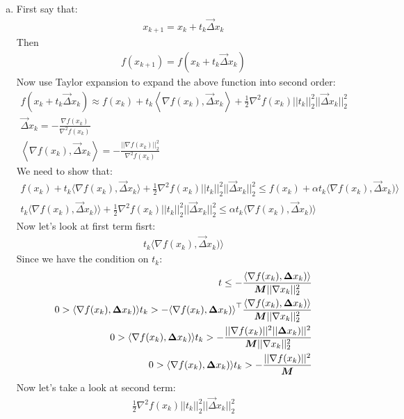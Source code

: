 \documentclass[12pt,twoside]{article}
\begin{document}
\begin{enumerate}[a)]
\item 
First say that:
\begin{align}
x_{k+1} = x_k + t_k \vec{\Delta}x_k
\end{align}
Then 
\begin{align}
f(x_{k+1}) = f(x_k + t_k \vec{\Delta}x_k)
\end{align}
Now use Taylor expansion to expand the above function into second order:
\begin{align}
f(x_k + t_k \vec{\Delta}x_k) \approx f(x_k) + t_k\left\langle\nabla f(x_k), \vec{\Delta}x_k\right\rangle + \frac{1}{2}\nabla^2 f(x_k)||t_k||_2^2||\vec{\Delta}x_k||_2^2\\
\vec{\Delta}x_k = - \frac{\nabla f(x_k)}{\nabla^2 f(x_k)}\\
\left\langle\nabla f(x_k), \vec{\Delta}x_k\right\rangle = - \frac{||\nabla f(x_k)||_2^2}{\nabla^2 f(x_k)}
\end{align}
We need to show that:
\begin{align}
f(x_k) + t_k\langle \nabla f(x_k), \vec{\Delta}x_k\rangle + \frac{1}{2}\nabla^2 f(x_k)||t_k||_2^2||\vec{\Delta}x_k||_2^2 \leq f(x_k) + \alpha t_k \langle\nabla f(x_k), \vec{\Delta}x_k)\rangle\\
t_k\langle\nabla f(x_k), \vec{\Delta}x_k)\rangle + \frac{1}{2}\nabla^2 f(x_k)||t_k||_2^2||\vec{\Delta}x_k||_2^2 \leq   \alpha t_k \langle\nabla f(x_k), \vec{\Delta}x_k)\rangle
\end{align}
Now let's look at first term fisrt:
\begin{align}
t_k\langle\nabla f(x_k), \vec{\Delta}x_k)\rangle
\end{align}
Since we have the condition on $t_k$:
\begin{align}
t \leq - \frac{\langle\nabla f(x_k), {\boldsymbol{{\Delta}}}x_k)\rangle}{{\boldsymbol{{M}}} ||\nabla x_k||_2^2}\\
0 > {\langle\nabla f(x_k), {\boldsymbol{{\Delta}}}x_k)\rangle}t_k > -{\langle\nabla f(x_k), {\boldsymbol{{\Delta}}}x_k)\rangle}^\top \frac{\langle\nabla f(x_k), {\boldsymbol{{\Delta}}}x_k)\rangle}{{\boldsymbol{{M}}} ||\nabla x_k||_2^2}\\
0 > {\langle\nabla f(x_k), {\boldsymbol{{\Delta}}}x_k)\rangle}t_k > -\frac{||\nabla f(x_k)||^2 ||{\boldsymbol{{\Delta}}}x_k)||^2}{{\boldsymbol{{M}}} ||\nabla x_k||_2^2}\\
0 > {\langle\nabla f(x_k), {\boldsymbol{{\Delta}}}x_k)\rangle}t_k > -\frac{||\nabla f(x_k)||^2}{{\boldsymbol{{M}}}}
\end{align}
Now let's take a look at second term:
\begin{align}
\frac{1}{2}\nabla^2 f(x_k)||t_k||_2^2||\vec{\Delta}x_k||_2^2

\end{align}
\end{enumerate}
\end{document}

